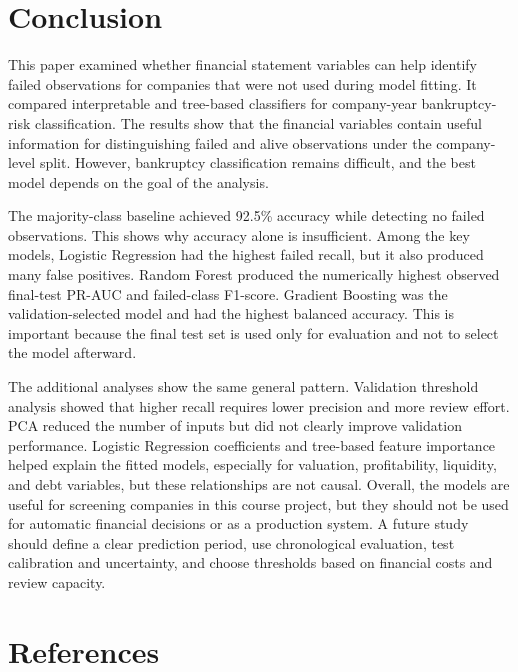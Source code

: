 \documentclass[11pt,a4paper]{article}
\begin{document}
\section{Conclusion}
\label{sec:conclusion}

This paper examined whether financial statement variables can help identify
failed observations for companies that were not used during model fitting. It
compared interpretable and tree-based classifiers for company-year
bankruptcy-risk classification. The results show that the financial variables
contain useful information for distinguishing failed and alive observations
under the company-level split. However, bankruptcy classification remains
difficult, and the best model depends on the goal of the analysis.

The majority-class baseline achieved 92.5\% accuracy while detecting no failed
observations. This shows why accuracy alone is insufficient. Among the key
models, Logistic Regression had the highest failed recall, but it also produced
many false positives. Random Forest produced the numerically highest observed
final-test PR-AUC and failed-class F1-score. Gradient Boosting was the
validation-selected model and had the highest balanced accuracy. This
is important because the final test set is used only for evaluation and not to
select the model afterward.

The additional analyses show the same general pattern. Validation threshold
analysis showed that higher recall requires lower precision and more review
effort. PCA reduced the number of inputs but did not clearly improve validation
performance. Logistic Regression coefficients and tree-based feature importance
helped explain the fitted models, especially for valuation, profitability,
liquidity, and debt variables, but these relationships are not causal. Overall,
the models are useful for screening companies in this course project, but they
should not be used for automatic financial decisions or as a production system.
A future study should define a clear prediction period, use chronological
evaluation, test calibration and uncertainty, and choose thresholds based on
financial costs and review capacity.


  {}
  {\section*{References}}
\end{document}
